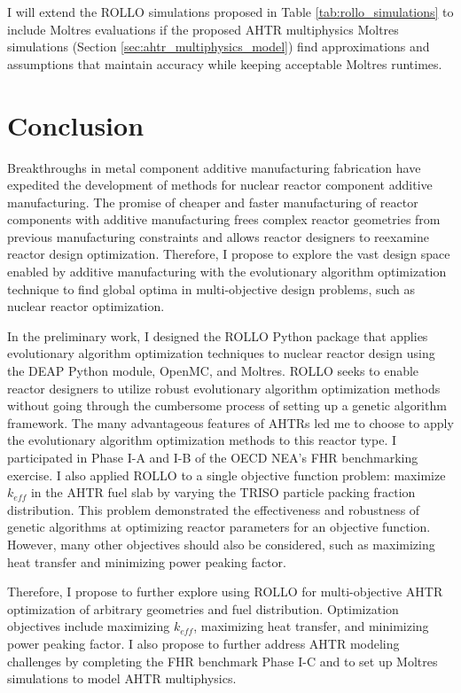 I will extend the ROLLO simulations proposed in Table \ref{tab:rollo_simulations} 
to include Moltres evaluations if the proposed \gls{AHTR} multiphysics
Moltres simulations (Section \ref{sec:ahtr_multiphysics_model}) find approximations 
and assumptions that maintain accuracy while keeping acceptable Moltres runtimes.

\section{Conclusion}
Breakthroughs in metal component additive manufacturing fabrication have 
expedited the development of methods for nuclear reactor component additive 
manufacturing.
The promise of cheaper and faster manufacturing of reactor components with 
additive manufacturing frees complex reactor geometries from previous manufacturing 
constraints and allows reactor designers to reexamine reactor design optimization. 
Therefore, I propose to explore the vast design space enabled by 
additive manufacturing with the evolutionary algorithm optimization technique 
to find global optima in multi-objective design problems, such as nuclear 
reactor optimization. 

In the preliminary work, I designed the \gls{ROLLO} Python package that applies 
evolutionary algorithm optimization techniques to nuclear reactor design using 
the \gls{DEAP} Python module, OpenMC, and Moltres.
\gls{ROLLO} seeks to enable reactor designers to utilize 
robust evolutionary algorithm optimization methods without going 
through the cumbersome process of setting up a genetic algorithm framework.
The many advantageous features of \glspl{AHTR} led me to choose to apply the 
evolutionary algorithm optimization methods to this reactor type.
I participated in Phase I-A and I-B of the \acrfull{OECD} \gls{NEA}'s \gls{FHR} 
benchmarking exercise. 
I also applied \gls{ROLLO} to a single objective function problem: maximize 
$k_{eff}$ in the \gls{AHTR} fuel slab by varying the \gls{TRISO} particle 
packing fraction distribution. 
This problem demonstrated the effectiveness and robustness of genetic algorithms 
at optimizing reactor parameters for an objective function. 
However, many other objectives should also be considered, such as maximizing heat 
transfer and minimizing power peaking factor.

Therefore, I propose to further explore using \gls{ROLLO} for multi-objective 
\gls{AHTR} optimization of arbitrary geometries and fuel distribution.
Optimization objectives include maximizing $k_{eff}$, maximizing heat transfer, 
and minimizing power peaking factor. 
I also propose to further address \gls{AHTR} modeling challenges by completing 
the \gls{FHR} benchmark Phase I-C and to set up Moltres simulations to model 
\gls{AHTR} multiphysics.